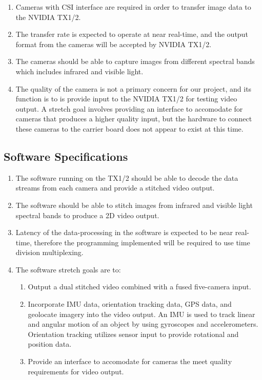 \documentclass[letterpaper,10pt,serif,draftclsnofoot,onecolumn,compsoc,titlepage]{IEEEtran}
\begin{document}
\begin{enumerate}[label=\alph*]
	\item Cameras with CSI interface are required in order to transfer image data to 
	the NVIDIA TX1/2.\\
	\item The transfer rate is expected to operate at near real-time, and the output format 
	from the cameras will be accepted by NVIDIA TX1/2.\\
	\item The cameras should be able to capture images from different spectral bands 
	which includes infrared and visible light.\\
	\item The quality of the camera is not a primary concern for our project, and its 
	function is to is provide input to the NVIDIA TX1/2 for testing video output. 
	A stretch goal involves providing an interface to accomodate for cameras that 
	produces a higher quality input, but the hardware to connect these cameras to the 
	carrier board does not appear to exist at this time.\\
\end{enumerate}

\subsection{Software Specifications}

\begin{enumerate}[label=\alph*]
	\item The software running on the TX1/2 should be able to decode the data streams 
	from each camera and provide a stitched video output.\\
	\item The software should be able to stitch images from infrared 
	and visible light spectral bands to produce a 2D video output. \\
	\item Latency of the data-processing in the software is expected to be near 
	real-time, therefore the programming implemented will be required to use time
	division multiplexing. \\
	\item The software stretch goals are to:
	\begin{enumerate}
	 	\item Output a dual stitched video combined with a fused five-camera input.\\
		\item Incorporate IMU data, orientation tracking data, GPS data, and geolocate 
		imagery into the video output. An IMU is used to track linear and angular 
		motion of an object by using gyroscopes and accelerometers. Orientation 
		tracking utilizes sensor input to provide rotational and position data.\\
		\item Provide an interface to accomodate for cameras the meet quality
		requirements for video output. \\
	\end{enumerate} 
\end{enumerate}
\end{document}

